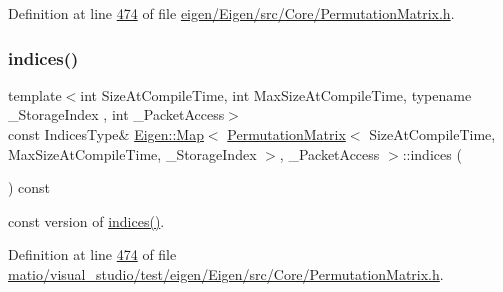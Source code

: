 Definition at line \hyperlink{eigen_2_eigen_2src_2_core_2_permutation_matrix_8h_source_l00474}{474} of file \hyperlink{eigen_2_eigen_2src_2_core_2_permutation_matrix_8h_source}{eigen/\+Eigen/src/\+Core/\+Permutation\+Matrix.\+h}.

\mbox{\label{class_eigen_1_1_map_3_01_permutation_matrix_3_01_size_at_compile_time_00_01_max_size_at_compile_2f9d18bf0084dbfb13fbbfe14adaf22d_a3f1607f68044608f11a256ba62c2e923}} 
\subsubsection{\texorpdfstring{indices()}{indices()}\hspace{0.1cm}{\footnotesize\ttfamily [2/4]}}
{\footnotesize\ttfamily template$<$int Size\+At\+Compile\+Time, int Max\+Size\+At\+Compile\+Time, typename \+\_\+\+Storage\+Index , int \+\_\+\+Packet\+Access$>$ \\
const Indices\+Type\& \hyperlink{group___core___module_class_eigen_1_1_map}{Eigen\+::\+Map}$<$ \hyperlink{group___core___module_class_eigen_1_1_permutation_matrix}{Permutation\+Matrix}$<$ Size\+At\+Compile\+Time, Max\+Size\+At\+Compile\+Time, \+\_\+\+Storage\+Index $>$, \+\_\+\+Packet\+Access $>$\+::indices (\begin{DoxyParamCaption}{ }\end{DoxyParamCaption}) const\hspace{0.3cm}{\ttfamily [inline]}}

const version of \hyperlink{class_eigen_1_1_map_3_01_permutation_matrix_3_01_size_at_compile_time_00_01_max_size_at_compile_2f9d18bf0084dbfb13fbbfe14adaf22d_af9771ec7bda9dfc5c5a6cc9857410c4c}{indices()}. 

Definition at line \hyperlink{matio_2visual__studio_2test_2eigen_2_eigen_2src_2_core_2_permutation_matrix_8h_source_l00474}{474} of file \hyperlink{matio_2visual__studio_2test_2eigen_2_eigen_2src_2_core_2_permutation_matrix_8h_source}{matio/visual\+\_\+studio/test/eigen/\+Eigen/src/\+Core/\+Permutation\+Matrix.\+h}.

